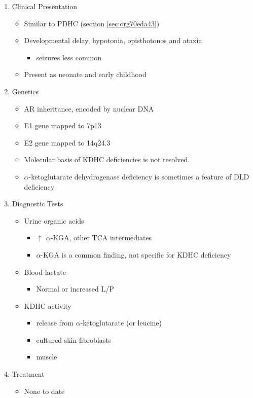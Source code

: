 \documentclass{scrartcl}
\begin{document}
\begin{enumerate}
\item Clinical Presentation
\label{sec:org51670d2}
\begin{itemize}
\item Similar to PDHC (section \ref{sec:org70eda43})
\item Developmental delay, hypotonia, opisthotonos and ataxia
\begin{itemize}
\item seizures less common
\end{itemize}
\item Present as neonate and early childhood
\end{itemize}

\item Genetics
\label{sec:orga7386e8}
\begin{itemize}
\item AR inheritance, encoded by nuclear DNA
\item E1 gene mapped to 7p13
\item E2 gene mapped to 14q24.3
\item Molecular basis of KDHC deficiencies is not resolved.
\item \(\alpha\)-ketoglutarate dehydrogenase deficiency is sometimes a feature of DLD deficiency
\end{itemize}

\item Diagnostic Tests
\label{sec:org491d392}
\begin{itemize}
\item Urine organic acids
\begin{itemize}
\item \(\uparrow\) \(\alpha\)-KGA, \textpm{} other TCA intermediates
\item \(\alpha\)-KGA is a common finding, not specific for KDHC deficiency
\end{itemize}
\item Blood lactate
\begin{itemize}
\item Normal or increased L/P
\end{itemize}
\item KDHC activity
\begin{itemize}
\item {} release from \ce{[1-^14C]} \(\alpha\)-ketoglutarate (or \ce{[1-^14C]} leucine)
\item cultured skin fibroblasts
\item muscle
\end{itemize}
\end{itemize}

\item Treatment
\label{sec:orgaa04f9a}
\begin{itemize}
\item None to date
\end{itemize}
\end{enumerate}
\end{document}
